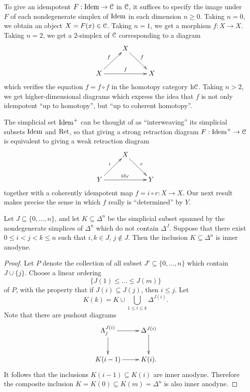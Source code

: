 To give an idempotent $F: \operatorname{Idem} \rightarrow \operatorname{\mathcal{C}}$ in $\operatorname{\mathcal{C}}$, it suffices to specify the image under $F$ of each nondegenerate simplex of $\operatorname{Idem}$ in each dimension $n \geq 0$. Taking $n=0$, we obtain an object $X = F(x) \in \operatorname{\mathcal{C}}$.
Taking $n=1$, we get a morphism $f: X \rightarrow X$. Taking $n=2$, we get a $2$-simplex of $\operatorname{\mathcal{C}}$ corresponding to a diagram
$$ \xymatrix{ & X \ar[dr]^{f} & \\
X \ar[ur]^{f} \ar[rr]^{f} & & X }$$
which verifies the equation $f = f \circ f$ in the homotopy category $\rm{h} \it{\operatorname{\mathcal{C}}}$. Taking $n > 2$, we
get higher-dimensional diagrams which express the idea that $f$ is not only idempotent ``up to homotopy'', but ``up to coherent homotopy''.

The simplicial set $\operatorname{Idem}^{+}$ can be thought of as ``interweaving'' its simplicial subsets
$\operatorname{Idem}$ and $\operatorname{Ret}$, so that giving a strong retraction diagram $F: \operatorname{Idem}^{+} \rightarrow \operatorname{\mathcal{C}}$
is equivalent to giving a weak retraction diagram
$$ \xymatrix{ & X \ar[dr]^{r} & \\
Y \ar[ur]^{i} \ar[rr]^{\id_{Y}} & & Y }$$
together with a coherently idempotent map $f = i \circ r: X \rightarrow X$. Our next result makes precise the sense in which $f$ really is ``determined'' by $Y$.

\begin{lemma}\label{sturbie}
Let $J \subseteq \{ 0, \ldots, n\}$, and let $K \subseteq \Delta^n$ be the simplicial subset spanned by the nondegenerate simplices of $\Delta^n$ which do not contain $\Delta^{J}$. Suppose
that there exist $0 \leq i < j < k \leq n$ such that $i,k \in J$, $j \notin J$. Then the inclusion
$K \subseteq \Delta^n$ is inner anodyne.
\end{lemma}

\begin{proof}
Let $P$ denote the collection of all subset $J' \subseteq \{0, \ldots, n\}$ which contain $J \cup \{j\}$. Choose a linear ordering
$$ \{ J(1) \leq \ldots \leq J(m) \}$$
of $P$, with the property that if $J(i) \subseteq J(j)$, then $i \leq j$. Let
$$K(k) = K \cup \bigcup_{ 1\leq i \leq k} \Delta^{ J(i) }.$$
Note that there are pushout diagrams
$$ \xymatrix{ \Lambda^{J(i)}_{j} \ar[r] \ar[d] & \Delta^{J(i)} \ar[d] \\
K(i-1) \ar[r] & K(i). }$$
It follows that the inclusions $K(i-1) \subseteq K(i)$ are inner anodyne. Therefore
the composite inclusion $K = K(0) \subseteq K(m) = \Delta^n$ is also inner anodyne.
\end{proof}

